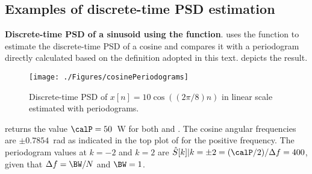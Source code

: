 



\subsection{Examples of discrete-time PSD estimation}

\bExample \textbf{Discrete-time PSD of a sinusoid using the  function}.
\label{ex:matlabPeriodogram}
 uses the {\matlab}  function to estimate the discrete-time PSD of a cosine and compares it with a periodogram directly calculated based on the definition adopted in this text.  depicts the result.


\begin{figure}[htbp]
\centering
\texttt{[image: ./Figures/cosinePeriodograms]}
\caption{Discrete-time PSD of $x[n]=10\cos((2\pi/8) n)$ in linear scale estimated with periodograms.\label{fig:cosinePeriodograms}}
\end{figure}

 returns the value $\calP=50$~W for both  and . 
The cosine angular frequencies are $\pm 0.7854$~rad as indicated in the top plot of  for the positive frequency. The periodogram values at $k=-2$ and $k=2$ 
are $\hat S[k]|{k=\pm 2}= (\calP/2) / \Delta f = 400$, given that $\Delta f = \BW / N$ and $\BW=1$.

